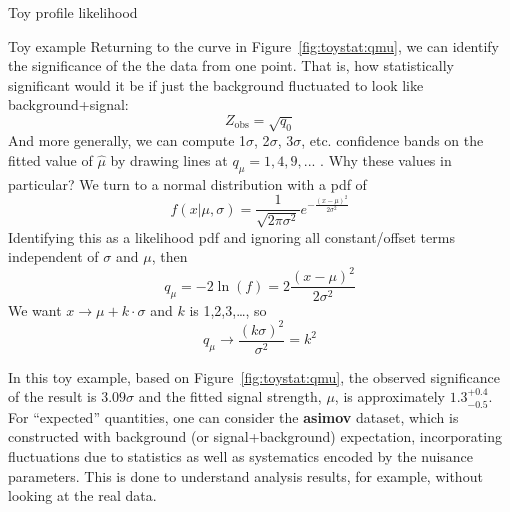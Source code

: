 \begin{section}{Toy profile likelihood}
\begin{subsection}{Toy example}
Returning to the curve in Figure~\ref{fig:toystat:qmu}, we can identify the significance of the the data from
one point. That is, how statistically significant would it be if just
the background fluctuated to look like background+signal: 
\begin{equation}
Z_\text{obs} = \sqrt{q_0}
\end{equation}
 And more generally, we can compute 1$\sigma$, 2$\sigma$,
3$\sigma$, etc. confidence bands on the fitted value of $\hat\mu$ by
drawing lines at $q_\mu=1,4,9,...$ . Why these values in particular? We turn to a
normal distribution with a pdf of
\begin{equation}
f(x|\mu,\sigma)=\frac{1}{\sqrt{2\pi\sigma^2}}e^{-\frac{(x-\mu)^2}{2\sigma^2}}
\end{equation}
Identifying this as a likelihood pdf and ignoring all constant/offset
terms independent of $\sigma$ and $\mu$, then 
\begin{equation}
q_\mu = -2\ln(f) = 2\frac{(x-\mu)^2}{2\sigma^2}
\end{equation}
 We want $x\rightarrow \mu+k\cdot\sigma$ and $k$ is
1,2,3,\ldots{}, so 
\begin{equation}
q_\mu \rightarrow \frac{(k\sigma)^2}{\sigma^2}=k^2
\end{equation}

In this toy example, based on Figure~\ref{fig:toystat:qmu}, the observed significance of the result is $3.09\sigma$
and the fitted signal strength, $\mu$, is approximately $1.3^{+0.4}_{-0.5}$.
For ``expected'' quantities, one can consider the \textbf{asimov} dataset, which is constructed
with background (or signal+background) expectation, incorporating fluctuations due to statistics as well
as systematics encoded by the nuisance parameters. This is done to understand analysis results, for example,
without looking at the real data.

\end{subsection}

\end{section}
